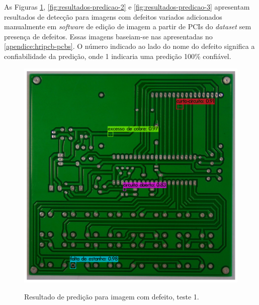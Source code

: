 As Figuras \ref{fig:resultados-predicao-1}, \ref{fig:resultados-predicao-2} e \ref{fig:resultados-predicao-3} apresentam resultados de detecção para imagens com defeitos variados adicionados manualmente em \textit{software} de edição de imagem a partir de PCIs do \textit{dataset} sem presença de defeitos.
Essas imagens baseiam-se nas apresentadas no \autoref{apendice:hripcb-pcbs}. O número indicado ao lado do nome do defeito significa a confiabilidade da predição, onde 1 indicaria uma predição 100\% confiável.

\begin{figure}[H] %
  \centering
  \caption{Resultado de predição para imagem com defeito, teste 1.}
  \includegraphics[scale=0.5]{img/img-resultados-predicao-1.jpg}
  \label{fig:resultados-predicao-1}
\end{figure}

